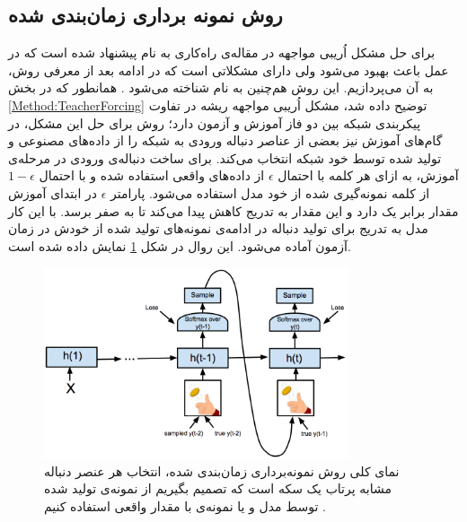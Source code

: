  \subsection{روش  نمونه برداری زمان‌بندی شده}
 برای حل مشکل اُریبی مواجهه در مقاله‌ی
  \cite{bengio2015scheduled}
 راه‌کاری به نام 
 پیشنهاد شده است که در عمل باعث بهبود می‌شود ولی  دارای مشکلاتی است که در ادامه بعد از معرفی روش، به آن می‌پردازیم. این روش  هم‌چنین به نام
 شناخته می‌شود
 \cite{ranzato2015sequence}.
 \newline
 همانطور که در بخش
 \ref{Method:TeacherForcing}
 توضیح داده شد، مشکل اُریبی مواجهه ریشه در تفاوت پیکربندی شبکه بین دو فاز آموزش  و آزمون دارد؛
 روش
   برای حل این مشکل، در گام‌های آموزش نیز بعضی از عناصر دنباله ورودی به شبکه را از داده‌های مصنوعی و تولید شده توسط خود شبکه انتخاب می‌کند.
 \newline
 برای ساخت دنباله‌ی ورودی در مرحله‌ی آموزش، به ازای هر کلمه با احتمال $\epsilon$ از داده‌های واقعی استفاده شده و با احتمال 
 $1-\epsilon$
 از کلمه نمونه‌گیری شده از خود مدل استفاده می‌شود. پارامتر $\epsilon$ در ابتدای آموزش مقدار برابر یک دارد و این مقدار به تدریج کاهش پیدا می‌کند تا به صفر برسد. با این کار مدل به تدریج برای تولید دنباله در ادامه‌ی نمونه‌های تولید شده از خودش در زمان آزمون آماده می‌شود.
 این روال در شکل 
 \ref{Figure:ScheduledSampling:Architecture}
 نمایش داده شده است.
\begin{figure}[!htb]
	\centering
	\includegraphics[width=0.8\textwidth]{images/ArchitectureSS.png} 
	\caption[نمای کلی روش نمونه‌برداری زمان‌بندی شده]
	{
نمای کلی روش نمونه‌برداری زمان‌بندی شده، انتخاب هر عنصر دنباله مشابه پرتاب یک سکه است که تصمیم بگیریم از نمونه‌ی تولید شده توسط مدل و یا نمونه‌ی با مقدار واقعی استفاده کنیم
		\cite{bengio2015scheduled}.
	}
	\label{Figure:ScheduledSampling:Architecture}
\end{figure}
